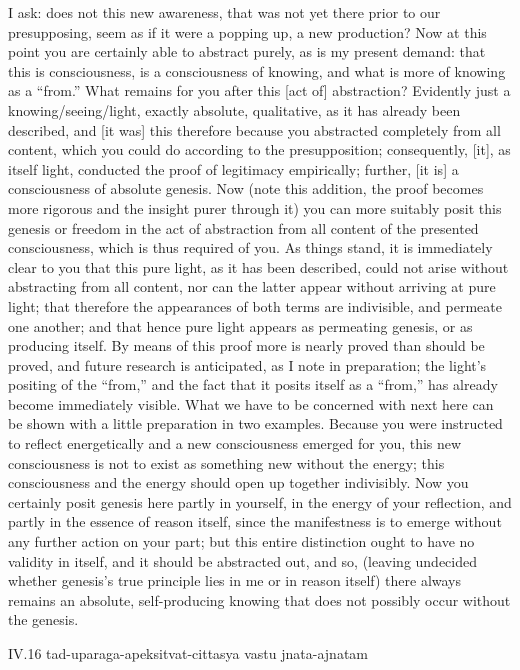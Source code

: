 I ask:
does not this new awareness,
that was not yet there prior to our presupposing,
seem as if it were a popping up, a new production?
Now at this point you are
certainly able to abstract purely,
as is my present demand:
that this is consciousness,
is a consciousness of knowing,
and what is more of knowing as a “from.”
What remains for you after this [act of] abstraction?
Evidently just a knowing/seeing/light,
exactly absolute, qualitative,
as it has already been described,
and [it was] this therefore because
you abstracted completely from all content,
which you could do according to the presupposition;
consequently, [it], as itself light, conducted
the proof of legitimacy empirically;
further, [it is] a consciousness of absolute genesis.
Now (note this addition, the proof becomes more rigorous
and the insight purer through it)
you can more suitably posit this genesis or freedom
in the act of abstraction from all content
of the presented consciousness,
which is thus required of you.
As things stand, it is immediately clear to you
that this pure light, as it has been described,
could not arise without abstracting from all content,
nor can the latter appear without arriving at pure light;
that therefore the appearances of both terms are indivisible,
and permeate one another;
and that hence pure light appears as permeating genesis,
or as producing itself.
By means of this proof more is
nearly proved than should be proved,
and future research is anticipated,
as I note in preparation;
the light's positing of the “from,”
and the fact that it posits itself as a “from,”
has already become immediately visible.
What we have to be concerned with next here
can be shown with a little preparation in two examples.
Because you were instructed to reflect energetically
and a new consciousness emerged for you,
this new consciousness is not to exist
as something new without the energy;
this consciousness and the energy should
open up together indivisibly.
Now you certainly posit genesis here
partly in yourself,
in the energy of your reflection,
and partly in the essence of reason itself,
since the manifestness is to emerge
without any further action on your part;
but this entire distinction ought to have no validity in itself,
and it should be abstracted out, and so,
(leaving undecided whether genesis's true principle
lies in me or in reason itself)
there always remains an absolute, self-producing knowing
that does not possibly occur without the genesis.

IV.16
tad-uparaga-apeksitvat-cittasya vastu jnata-ajnatam

